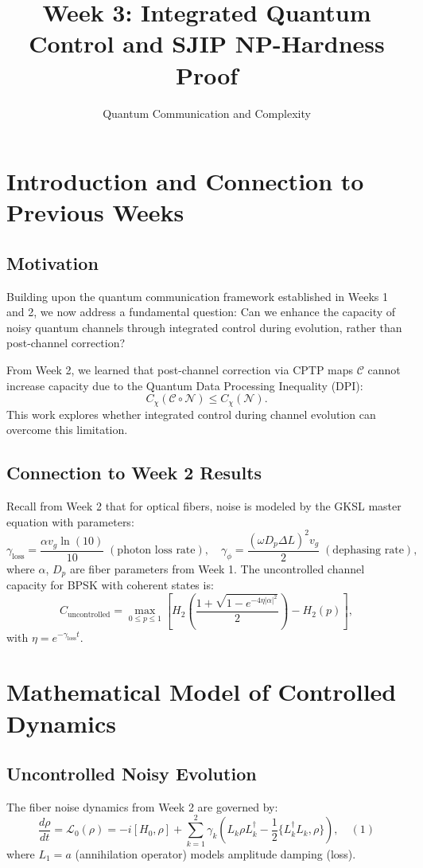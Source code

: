 \documentclass[12pt]{article}
\title{Week 3: Integrated Quantum Control and SJIP NP-Hardness Proof}
\author{Quantum Communication and Complexity}
\date{}
\newcommand{\Lgen}{\mathcal{L}}
\begin{document}
\maketitle

\tableofcontents

\section{Introduction and Connection to Previous Weeks}
\subsection{Motivation}
Building upon the quantum communication framework established in Weeks 1 and 2, we now address a fundamental question: Can we enhance the capacity of noisy quantum channels through integrated control during evolution, rather than post-channel correction?

From Week 2, we learned that post-channel correction via CPTP maps $\mathcal{C}$ cannot increase capacity due to the Quantum Data Processing Inequality (DPI):
\[
C_{\chi}(\mathcal{C}\circ \mathcal{N})\leq C_{\chi}(\mathcal{N}).
\]
This work explores whether integrated control during channel evolution can overcome this limitation.

\subsection{Connection to Week 2 Results}
Recall from Week 2 that for optical fibers, noise is modeled by the GKSL master equation with parameters:
\[
\gamma_{\mathrm{loss}} = \frac{\alpha v_g\ln(10)}{10}\;(\text{photon loss rate}), \quad
\gamma_{\phi} = \frac{(\omega D_p\Delta L)^2v_g}{2}\;(\text{dephasing rate}),
\]
where $\alpha$, $D_{p}$ are fiber parameters from Week 1. The uncontrolled channel capacity for BPSK with coherent states is:
\[
C_{\mathrm{uncontrolled}} = \max_{0\leq p\leq 1}\left[H_2\left(\frac{1 + \sqrt{1 - e^{-4\eta|\alpha|^2}}}{2}\right) - H_2(p)\right],
\]
with $\eta = e^{- \gamma_{\mathrm{loss}}t}$.

\section{Mathematical Model of Controlled Dynamics}
\subsection{Uncontrolled Noisy Evolution}
The fiber noise dynamics from Week 2 are governed by:
\[
\frac{d\rho}{dt} = \Lgen_0(\rho) = -i[H_0,\rho ] + \sum_{k = 1}^{2}\gamma_k\left(L_k\rho L_k^\dagger -\frac{1}{2}\{L_k^\dagger L_k,\rho \}\right), \quad (1)
\]
where $L_{1} = a$ (annihilation operator) models amplitude damping (loss).
\end{document}
